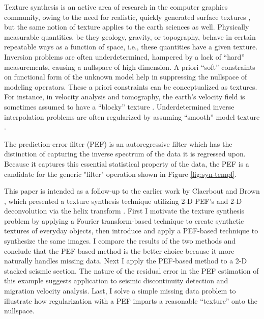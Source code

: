 	\par
	Texture synthesis is an active area of research in the computer 
	graphics community, owing to the need for realistic, quickly generated surface 
	textures {\small \cite{simoncelli,heeger,brown-mao}}, but the same notion of texture 
	applies to the earth sciences as well.  Physically measurable quantities, be they
	geology, gravity, or topography, behave in certain repeatable ways as a function of
	space, i.e., these quantities have a given texture.  Inversion problems are often
	underdetermined, hampered by a lack of ``hard'' measurements, causing a nullspace of high 
	dimension.  A priori ``soft'' constraints on functional form of the unknown model  
	help in suppressing the nullspace of modeling operators.  These a priori constraints 
	can be conceptualized as textures.  For instance, in velocity analysis and 
	tomography, the earth's velocity field is sometimes assumed to have a ``blocky''
	texture {\small \cite{Clapp.sep.97.bob1}}.  Underdetermined inverse interpolation 
	problems are often regularized by assuming ``smooth'' model texture {\small \cite{gee}}.

	\par
	The prediction-error filter (PEF) is an autoregressive filter which has the distinction 
	of capturing the inverse spectrum of the data it is regressed upon.  
	Because it captures this essential statistical property of the data, the PEF is a 
	candidate for the generic "filter" operation shown in Figure \ref{fig:syn-templ}.

	\par
	This paper is intended as a follow-up to the earlier work by Claerbout and Brown
	{\small {}}, which presented a texture synthesis technique utilizing
	2-D PEF's and 2-D deconvolution via the helix transform {\small \cite{helix}}.  
	First I motivate the texture synthesis problem by applying a Fourier transform-based 
	technique to create synthetic textures of everyday objects, then introduce and apply 
	a PEF-based technique to synthesize the same images.  
	I compare the results of the two methods and conclude that the PEF-based method is the 
	better choice because it more naturally handles missing data. 
	Next I apply the PEF-based method to a 2-D stacked seismic section.  The nature of
	the residual error in the PEF estimation of this example suggests application
	to seismic discontinuity detection and migration velocity analysis.
	Last, I solve a simple missing data problem to illustrate how regularization
	with a PEF imparts a reasonable ``texture'' onto the nullspace.

